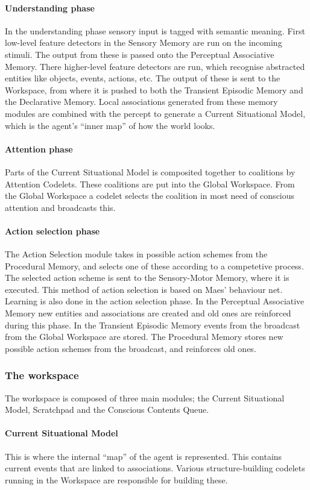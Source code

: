 \paragraph{Understanding phase}
In the understanding phase sensory input is tagged with semantic meaning. First low-level feature detectors in the Sensory Memory are run on the incoming stimuli. The output from these is passed onto the Perceptual Associative Memory. There higher-level feature detectors are run, which recognise abstracted entities like objects, events, actions, etc. The output of these is sent to the Workspace, from where it is pushed to both the Transient Episodic Memory and the Declarative Memory. Local associations generated from these memory modules are combined with the percept to generate a Current Situational Model, which is the agent's ``inner map'' of how the world looks.
\paragraph{Attention phase}
Parts of the Current Situational Model is composited together to coalitions by
Attention Codelets. These coalitions are put into the Global Workspace.
From the Global Workspace a codelet selects the coalition in most need of
conscious attention and broadcasts this.
\paragraph{Action selection phase}
The Action Selection module takes in possible action schemes from the Procedural Memory, and selects one of these according to a competetive process. The selected action scheme is sent to the Sensory-Motor Memory, where it is executed. This method of action selection is based on Maes' behaviour net.\cite{maes1989right} Learning is also done in the action selection phase. In the Perceptual Associative Memory new entities and associations are created and old ones are reinforced during this phase. In the Transient Episodic Memory events from the broadcast from the Global Workspace are stored. The Procedural Memory stores new possible action schemes from the broadcast, and reinforces old ones.


\subsubsection{The workspace}
The workspace is composed of three main modules; the Current Situational Model,
Scratchpad and the Conscious Contents Queue.
\paragraph{Current Situational Model} This is where the internal ``map'' of the
agent is represented. This contains current events that are linked to
associations. Various structure-building codelets running in the Workspace are
responsible for building these.
